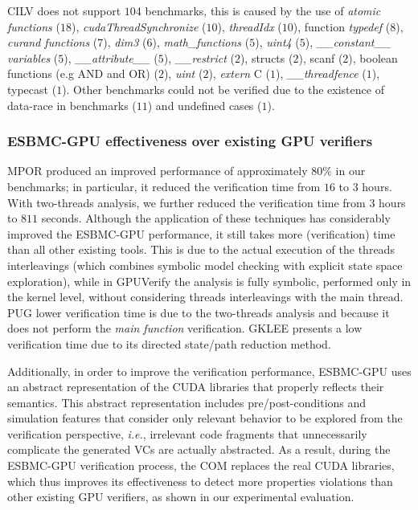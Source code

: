 \documentclass[times, doublespace]{cpeauth}
\begin{document}
CILV does not support $104$ benchmarks, this is caused by the use of \textit{atomic functions} ($18$), \textit{cudaThreadSynchronize} ($10$), \textit{threadIdx} ($10$), function \textit{typedef} ($8$), \textit{curand functions} ($7$), \textit{dim3} ($6$), \textit{math\_functions} ($5$), \textit{uint4} ($5$), \textit{\_\_constant\_\_ variables} ($5$), \textit{\_\_attribute\_\_} ($5$), \textit{\_\_restrict}  ($2$),  structs ($2$), scanf ($2$), boolean functions (e.g AND and OR) ($2$), \textit{uint} ($2$), \textit{extern} C ($1$), \textit{\_\_threadfence}  ($1$), typecast ($1$). Other benchmarks could not be verified due to the existence of data-race in benchmarks ($11$) and undefined cases ($1$).

\subsubsection{ESBMC-GPU effectiveness over existing GPU verifiers}
\vspace{-2pt}

MPOR produced an improved performance of approximately $80\%$ in our benchmarks; in particular, it reduced the verification time from $16$ to $3$ hours. With two-threads analysis, we further reduced the verification time from $3$ hours to $811$ seconds. Although the application of these techniques has considerably improved the ESBMC-GPU performance, it still takes more (verification) time than all other existing tools. This is due to the actual execution of the threads interleavings (which combines symbolic model checking with explicit state space exploration), while in GPUVerify the analysis is fully symbolic, performed only in the kernel level, without considering threads interleavings with the main thread. PUG lower verification time is due to the two-threads analysis and because it does not perform the \textit{main function} verification. GKLEE presents a low verification time due to its directed state/path reduction method.

Additionally, in order to improve the verification performance, ESBMC-GPU uses an abstract representation of the CUDA libraries that properly reflects their semantics. This abstract representation includes pre/post-conditions and simulation features that consider only relevant behavior to be explored from the verification perspective, {\it i.e.}, irrelevant code fragments that unnecessarily complicate the generated VCs are actually abstracted. As a result, during the ESBMC-GPU verification process, the COM replaces the real CUDA libraries, which thus improves its effectiveness to detect more properties violations than other existing GPU verifiers, as shown in our experimental evaluation.
\end{document}
